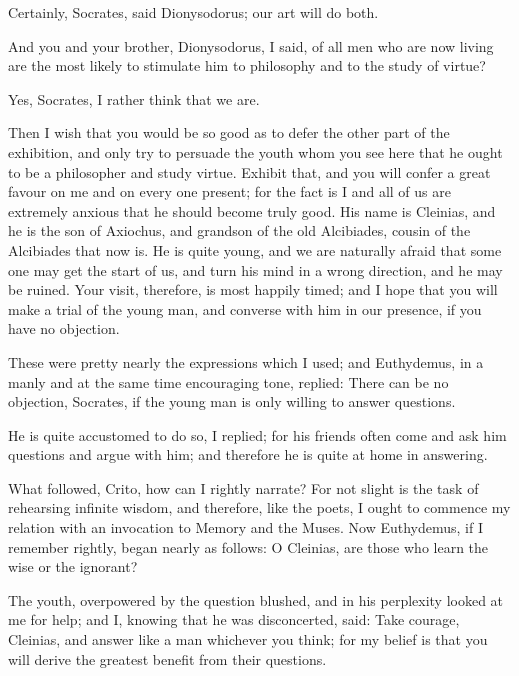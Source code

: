 \documentclass[11pt,letter]{article}
\begin{document}
\par  Certainly, Socrates, said Dionysodorus; our art will do both.

\par  And you and your brother, Dionysodorus, I said, of all men who are now living are the most likely to stimulate him to philosophy and to the study of virtue?

\par  Yes, Socrates, I rather think that we are.

\par  Then I wish that you would be so good as to defer the other part of the exhibition, and only try to persuade the youth whom you see here that he ought to be a philosopher and study virtue. Exhibit that, and you will confer a great favour on me and on every one present; for the fact is I and all of us are extremely anxious that he should become truly good. His name is Cleinias, and he is the son of Axiochus, and grandson of the old Alcibiades, cousin of the Alcibiades that now is. He is quite young, and we are naturally afraid that some one may get the start of us, and turn his mind in a wrong direction, and he may be ruined. Your visit, therefore, is most happily timed; and I hope that you will make a trial of the young man, and converse with him in our presence, if you have no objection.

\par  These were pretty nearly the expressions which I used; and Euthydemus, in a manly and at the same time encouraging tone, replied: There can be no objection, Socrates, if the young man is only willing to answer questions.

\par  He is quite accustomed to do so, I replied; for his friends often come and ask him questions and argue with him; and therefore he is quite at home in answering.

\par  What followed, Crito, how can I rightly narrate? For not slight is the task of rehearsing infinite wisdom, and therefore, like the poets, I ought to commence my relation with an invocation to Memory and the Muses. Now Euthydemus, if I remember rightly, began nearly as follows: O Cleinias, are those who learn the wise or the ignorant?

\par  The youth, overpowered by the question blushed, and in his perplexity looked at me for help; and I, knowing that he was disconcerted, said: Take courage, Cleinias, and answer like a man whichever you think; for my belief is that you will derive the greatest benefit from their questions.
\end{document}
